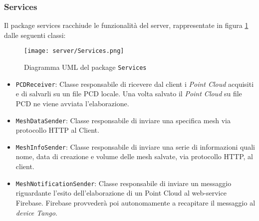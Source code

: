 \subsubsection{Services}
Il package services racchiude le funzionalità del server, rappresentate in figura \ref{fig:Services} dalle seguenti classi:
\begin{figure}[!h] 
    \centering 
    \texttt{[image: server/Services.png]} 
    \caption{Diagramma UML del package \texttt{Services}}
   \label{fig:Services}
\end{figure}
\begin{itemize}
\item\texttt{PCDReceiver}: Classe responsabile di ricevere dal client i \emph{Point Cloud} acquisiti e di salvarli su un file PCD locale. Una volta salvato il \emph{Point Cloud} su file PCD ne viene avviata l'elaborazione.
\item\texttt{MeshDataSender}: Classe responsabile di inviare una specifica mesh via protocollo HTTP al Client.
\item\texttt{MeshInfoSender}: Classe responsabile di inviare una serie di informazioni quali nome, data di creazione e volume delle mesh salvate, via protocollo HTTP, al client.
\item\texttt{MeshNotificationSender}: Classe responsabile di inviare un messaggio riguardante l'esito dell'elaborazione di un Point Cloud al web-service Firebase. Firebase provvederà poi autonomamente a recapitare il messaggio al \emph{device Tango}.
\end{itemize}

